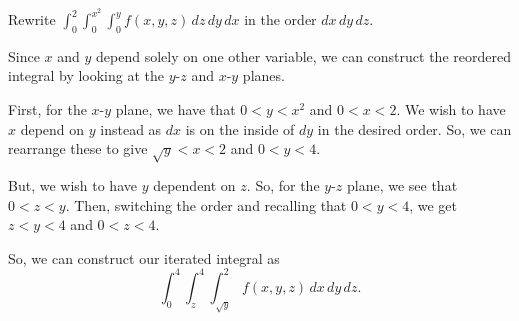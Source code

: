 \documentclass[../hw7]{subfiles}
\begin{document}
\begin{problem}[5]
Rewrite $\int_{0}^{2} \int_{0}^{x^2} \int_{0}^{y} f(x,y,z) \,dz \,dy \,dx$ in the order $dx\,dy\,dz$.
\end{problem}
Since $x$ and $y$ depend solely on one other variable, we can construct the reordered integral by looking at the  $y$-$z$ and $x$-$y$ planes. 

First, for the $x$-$y$ plane, we have that $0<y<x^2$ and $0<x<2$. 
We wish to have $x$ depend on $y$ instead as  $dx$ is on the inside of  $dy$ in the desired order. So, we can rearrange these to give $\sqrt{y}<x<2$ and $0<y<4$. 

But, we wish to have $y$ dependent on $z$. 
So, for the $y$-$z$ plane, we see that $0<z<y$. 
Then, switching the order and recalling that $0<y<4$, we get $z<y<4$ and  $0<z<4$.

So, we can construct our iterated integral as \[
\int_{0}^{4} \int_{z}^{4} \int_{\sqrt{y} }^{2} f(x,y,z) \,dx \,dy \,dz
.\] 
\end{document}
